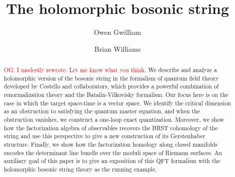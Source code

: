 \documentclass{conm-p-l}
\theoremstyle{definition}
\theoremstyle{remark}
\numberwithin{equation}{section}
\def\owen{\textcolor{red}{OG: }\textcolor{red}}
\begin{document}
\title{The holomorphic bosonic string}

\author{Owen Gwilliam}
\address{Max Planck Institute for Mathematics, Bonn, Germany}

\author{Brian Williams}
\address{Department of Mathematics, Northwestern University, Evanston, IL}

\date{}

\begin{abstract}
\owen{I modestly rewrote. Let me know what you think.}
We describe and analyze a holomorphic version of the bosonic string in the formalism of quantum field theory developed by Costello and collaborators, which provides a powerful combination of renormalization theory and the Batalin-Vilkovisky formalism. Our focus here is on the case in which the target space-time is a vector space. We identify the critical dimension as an obstruction to satisfying the quantum master equation, and when the obstruction vanishes, we construct a one-loop exact quantization. Moreover, we show how the factorization algebra of observables recovers the BRST cohomology of the string and use this perspective to give a new construction of its Gerstenhaber structure. Finally, we show how the factorization homology along closed manifolds encodes the determinant line bundle over the moduli space of Riemann surfaces.
An auxiliary goal of this paper is to give an exposition of this QFT formalism with the holomorphic bosonic string theory as the running example.
\end{abstract}

\maketitle


\setcounter{tocdepth}{1}

\tableofcontents














\end{document}
